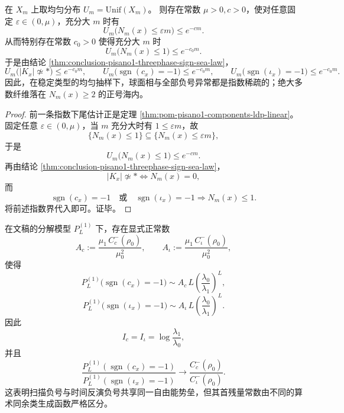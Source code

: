 \begin{corollary}[正号海的指数统治与球面相的测度消失]\label{cor:conclusion-pisano1-positive-sea-exponential-dominance}
在 \(X_m\) 上取均匀分布 \(U_m=\mathrm{Unif}(X_m)\)。
则存在常数 \(\mu>0,c>0\)，使对任意固定 \(\varepsilon\in(0,\mu)\)，充分大 \(m\) 时有
\[
U_m\bigl(N_m(x)\le \varepsilon m\bigr)\le e^{-cm}.
\]
从而特别存在常数 \(c_0>0\) 使得充分大 \(m\) 时
\[
U_m\bigl(N_m(x)\le 1\bigr)\le e^{-c_0m}.
\]
于是由结论 \ref{thm:conclusion-pisano1-threephase-sign-sea-law}，
\[
U_m\bigl(|K_x|\not\simeq *\bigr)\le e^{-c_0m},
\qquad
U_m\bigl(\operatorname{sgn}(c_x)=-1\bigr)\le e^{-c_0m},
\qquad
U_m\bigl(\operatorname{sgn}(\iota_x)=-1\bigr)\le e^{-c_0m}.
\]
因此，在稳定类型的均匀抽样下，球面相与全部负号异常都是指数稀疏的；绝大多数纤维落在 \(N_m(x)\ge 2\) 的正号海内。
\end{corollary}

\begin{proof}
前一条指数下尾估计正是定理 \ref{thm:pom-pisano1-components-ldp-linear}。
固定任意 \(\varepsilon\in(0,\mu)\)，当 \(m\) 充分大时有 \(1\le \varepsilon m\)，故
\[
\{N_m(x)\le 1\}\subseteq \{N_m(x)\le \varepsilon m\},
\]
于是
\[
U_m\bigl(N_m(x)\le 1\bigr)\le e^{-cm}.
\]
再由结论 \ref{thm:conclusion-pisano1-threephase-sign-sea-law}，
\[
|K_x|\not\simeq * \iff N_m(x)=0,
\]
而
\[
\operatorname{sgn}(c_x)=-1
\quad\text{或}\quad
\operatorname{sgn}(\iota_x)=-1
\Longrightarrow
N_m(x)\le 1.
\]
将前述指数界代入即可。证毕。
\end{proof}

\begin{theorem}[双负号事件的同势垒异残量]\label{thm:conclusion-negative-sign-same-barrier-different-residue}
在文稿的分解模型 \(P_L^{(1)}\) 下，存在显式正常数
\[
A_c:=\frac{\mu_1\,C_c^{-}(\rho_0)}{\mu_0^2},
\qquad
A_\iota:=\frac{\mu_1\,C_\iota^{-}(\rho_0)}{\mu_0^2},
\]
使得
\[
P_L^{(1)}\!\bigl(\operatorname{sgn}(c_x)=-1\bigr)\sim A_c\,L\left(\frac{\lambda_0}{\lambda_1}\right)^L,
\]
\[
P_L^{(1)}\!\bigl(\operatorname{sgn}(\iota_x)=-1\bigr)\sim A_\iota\,L\left(\frac{\lambda_0}{\lambda_1}\right)^L.
\]
因此
\[
I_c=I_\iota=\log\frac{\lambda_1}{\lambda_0},
\]
并且
\[
\frac{P_L^{(1)}(\operatorname{sgn}(c_x)=-1)}
{P_L^{(1)}(\operatorname{sgn}(\iota_x)=-1)}
\longrightarrow
\frac{C_c^{-}(\rho_0)}{C_\iota^{-}(\rho_0)}.
\]
这表明扫描负号与时间反演负号共享同一自由能势垒，但其首残量常数由不同的算术同余类生成函数严格区分。
\end{theorem}

